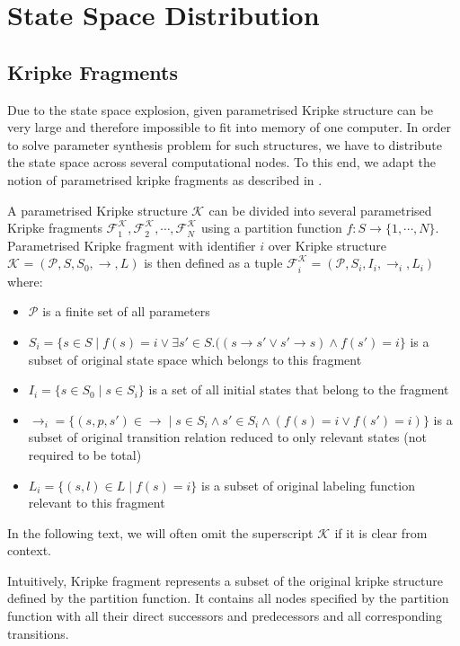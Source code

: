 \documentclass[12pt,oneside, draft]{fithesis2}
\newcommand{\ks}[1][]{\ensuremath{\mathcal{K}_{#1}}}
\newcommand{\kf}[2]{\ensuremath{\mathcal{F}^{#2}_{#1}}}
\newcommand{\fullKs}{\ensuremath{ \ks = (\params, S, S_0, \trans{}, L) }}
\newcommand{\fullKf}[2]{\ensuremath{ \kf{#1}{#2} = (\params, S_{#1}, I_{i}, \trans{}_{#1}, L_{#1}) }}
\newcommand{\trans}[1]{\stackrel{#1}{\rightarrow}}
\newcommand{\params}{\mathcal{P}}
\begin{document}
	\chapter{State Space Distribution}
				
		\section{Kripke Fragments}
		
			Due to the state space explosion, given parametrised Kripke structure can be very large and therefore impossible to fit into memory of one computer. In order to solve parameter synthesis problem for such structures, we have to distribute the state space across several computational nodes. To this end, we adapt the notion of parametrised kripke fragments as described in \cite{assumptions}.
			
			A parametrised Kripke structure $\ks$ can be divided into several parametrised Kripke fragments $\kf{1}{\ks}, \kf{2}{\ks}, \cdots , \kf{N}{\ks}$ using a partition function $f : S \rightarrow \{1, \cdots , N \}$. Parametrised Kripke fragment with identifier $i$ over Kripke structure $\fullKs$ is then defined as a tuple $\fullKf{i}{\ks}$ where:
			
			\begin{itemize}
				\item $\params$ is a finite set of all parameters
				\item $S_{i} = \{ s \in S \mid f(s) = i \vee \exists s'\in S. ((s \trans{} s' \vee s' \trans{} s) \wedge f(s') = i \}$ is a subset of original state space which belongs to this fragment
				\item $I_{i} = \{ s \in S_0 \mid s \in S_{i} \} $ is a set of all initial states that belong to the fragment
				\item $\trans{}_{i} = \{ (s, p, s') \in \trans{} \mid s \in S_{i} \wedge s' \in S_{i} \wedge (f(s) = i \vee f(s') = i) \}$ is a subset of original transition relation reduced to only relevant states (not required to be total)
				\item $L_{i} = \{ (s, l) \in L \mid f(s) = i \}$ is a subset of original labeling function relevant to this fragment
			\end{itemize}
						
			In the following text, we will often omit the superscript $\ks$ if it is clear from context.
			
			Intuitively, Kripke fragment represents a subset of the original kripke structure defined by the partition function. It contains all nodes specified by the partition function with all their direct successors and predecessors and all corresponding transitions. 			
			
\end{document}
